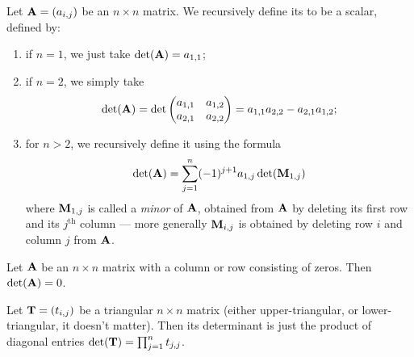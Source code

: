 \begin{definition}
Let $\mathbf{A}=(a_{i,j})$ be an $n\times n$ matrix. 
We recursively define its  to be a scalar, defined by:
\begin{enumerate}
\item if $n=1$, we just take $\det(\mathbf{A})=a_{1,1}$;
\item if $n=2$, we simply take
  \begin{equation}
    \det(\mathbf{A}) = \det\begin{pmatrix}a_{1,1} & a_{1,2}\\
    a_{2,1} & a_{2,2}
    \end{pmatrix} = a_{1,1}a_{2,2} - a_{2,1}a_{1,2};
  \end{equation}
\item for $n>2$, we recursively define it using the formula
  \begin{equation}
\det(\mathbf{A}) = \sum_{j=1}^{n}(-1)^{j+1}a_{1,j}\det(\mathbf{M}_{1,j})
  \end{equation}
  where $\mathbf{M}_{1,j}$ is called a \emph{minor} of $\mathbf{A}$, obtained
  from $\mathbf{A}$ by deleting its first row and its $j^{\text{th}}$
  column --- more generally $\mathbf{M}_{i,j}$ is obtained by deleting row
  $i$ and column $j$ from $\mathbf{A}$.
\end{enumerate}
\end{definition}

\begin{lemma}
Let $\mathbf{A}$ be an $n\times n$ matrix with a column or row consisting of
zeros. Then $\det(\mathbf{A})=0$.
\end{lemma}

\begin{theorem}
Let $\mathbf{T}=(t_{i,j})$ be a triangular $n\times n$ matrix (either
upper-triangular, or lower-triangular, it doesn't matter).
Then its determinant is just the product of diagonal entries
$\det(\mathbf{T}) = \prod_{j=1}^{n}t_{j,j}$.
\end{theorem}

